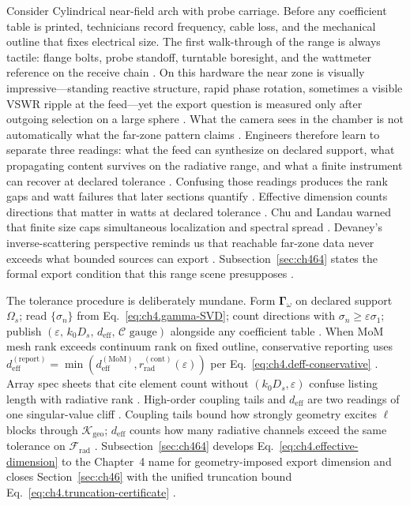 \begin{physicalvignette}
Consider Cylindrical near-field arch with probe carriage. Before any coefficient table is printed, technicians record frequency, cable loss, and the mechanical outline that fixes electrical size. The first walk-through of the range is always tactile: flange bolts, probe standoff, turntable boresight, and the wattmeter reference on the receive chain \cite{hansen1988}.
On this hardware the near zone is visually impressive---standing reactive structure, rapid phase rotation, sometimes a visible VSWR ripple at the feed---yet the export question is measured only after outgoing selection on a large sphere \cite{harrington2001}. What the camera sees in the chamber is not automatically what the far-zone pattern claims \cite{stratton1941}.
Engineers therefore learn to separate three readings: what the feed can synthesize on declared support, what propagating content survives on the radiative range, and what a finite instrument can recover at declared tolerance \cite{devaney2004}. Confusing those readings produces the rank gaps and watt failures that later sections quantify \cite{pal2026}.
Effective dimension counts directions that matter in watts at declared tolerance . 
Chu and Landau warned that finite size caps simultaneous localization and spectral spread \cite{chu1948}. Devaney's inverse-scattering perspective reminds us that reachable far-zone data never exceeds what bounded sources can export \cite{devaney2004}.
Subsection~\ref{sec:ch464} states the formal export condition that this range scene presupposes \cite{stratton1941}.
\end{physicalvignette}
The tolerance procedure is deliberately mundane. Form $\boldsymbol{\Gamma}_\omega$ on declared support $\Omega_s$; read $\{\sigma_n\}$ from Eq.~\eqref{eq:ch4.gamma-SVD}; count directions with $\sigma_n\ge\varepsilon\sigma_1$; publish $(\varepsilon,\,k_0 D_s,\,d_{\mathrm{eff}},\,\mathcal{C}\text{ gauge})$ alongside any coefficient table \cite{hansen1988}. When MoM mesh rank exceeds continuum rank on fixed outline, conservative reporting uses $d_{\mathrm{eff}}^{\mathrm{(report)}}=\min(d_{\mathrm{eff}}^{\mathrm{(MoM)}},r_{\mathrm{rad}}^{\mathrm{(cont)}}(\varepsilon))$ per Eq.~\eqref{eq:ch4.deff-conservative} \cite{harrington2001}. Array spec sheets that cite element count without $(k_0 D_s,\varepsilon)$ confuse listing length with radiative rank \cite{devaney2004}.
High-order coupling tails and $d_{\mathrm{eff}}$ are two readings of one singular-value cliff \cite{hansen1988}. Coupling tails bound how strongly geometry excites $\ell$ blocks through $\boldsymbol{\mathcal{K}}_{\mathrm{geo}}$; $d_{\mathrm{eff}}$ counts how many radiative channels exceed the same tolerance on $\mathcal{F}_{\mathrm{rad}}$ \cite{stratton1941}. Subsection~\ref{sec:ch464} develops Eq.~\eqref{eq:ch4.effective-dimension} to the Chapter~4 name for geometry-imposed export dimension and closes Section~\ref{sec:ch46} with the unified truncation bound Eq.~\eqref{eq:ch4.truncation-certificate} \cite{jackson1999}.
